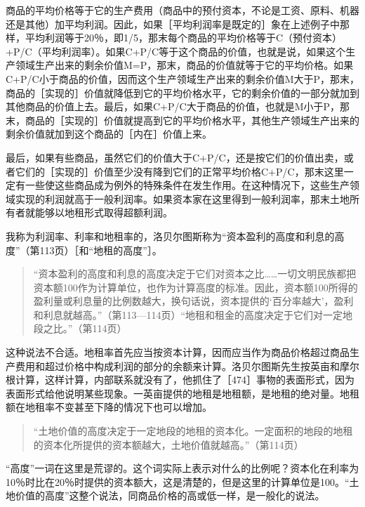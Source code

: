 商品的平均价格等于它的生产费用（商品中的预付资本，不论是工资、原料、机器还是其他）加平均利润。因此，如果［平均利润率是既定的］象在上述例子中那样，平均利润等于20％，即1/5，那末每个商品的平均价格等于C（预付资本）+P/C（平均利润率）。如果C+P/C等于这个商品的价值，也就是说，如果这个生产领域生产出来的剩余价值M=P，那末，商品的价值就等于它的平均价格。如果C+P/C小于商品的价值，因而这个生产领域生产出来的剩余价值M大于P，那末，商品的［实现的］价值就降低到它的平均价格水平，它的剩余价值的一部分就加到其他商品的价值上去。最后，如果C+P/C大于商品的价值，也就是M小于P，那末，商品的［实现的］价值就提高到它的平均价格水平，其他生产领域生产出来的剩余价值就加到这个商品的［内在］价值上来。

最后，如果有些商品，虽然它们的价值大于C+P/C，还是按它们的价值出卖，或者它们的［实现的］价值至少没有降到它们的正常平均价格C+P/C，那末这里一定有一些使这些商品成为例外的特殊条件在发生作用。在这种情况下，这些生产领域实现的利润就高于一般利润率。如果资本家在这里得到一般利润率，那末土地所有者就能够以地租形式取得超额利润。


我称为利润率、利率和地租率的，洛贝尔图斯称为“资本盈利的高度和利息的高度”（第113页）［和“地租的高度”］。

\begin{quote}{“资本盈利的高度和利息的高度决定于它们对资本之比……一切文明民族都把资本额100作为计算单位，也作为计算高度的标准。因此，资本额100所得的盈利量或利息量的比例数越大，换句话说，资本提供的‘百分率越大’，盈利和利息就越高。”（第113—114页）“地租和租金的高度决定于它们对一定地段之比。”（第114页）}\end{quote}

这种说法不合适。地租率首先应当按资本计算，因而应当作为商品价格超过商品生产费用和超过价格中构成利润的部分的余额来计算。洛贝尔图斯先生按英亩和摩尔根计算，这样计算，内部联系就没有了，他抓住了［474］事物的表面形式，因为表面形式给他说明某些现象。一英亩提供的地租是地租额，是地租的绝对量。地租额在地租率不变甚至下降的情况下也可以增加。

\begin{quote}{“土地价值的高度决定于一定地段的地租的资本化。一定面积的地段的地租的资本化所提供的资本额越大，土地价值就越高。”（第114页）}\end{quote}

“高度”一词在这里是荒谬的。这个词实际上表示对什么的比例呢？资本化在利率为10％时比在20％时提供的资本额大，这是清楚的，但是这里的计算单位是100。“土地价值的高度”这整个说法，同商品价格的高或低一样，是一般化的说法。

